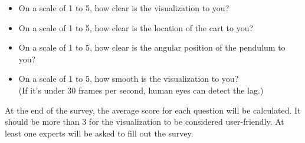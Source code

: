 \documentclass[12pt, titlepage]{article}
\begin{document}
\begin{enumerate}
        \begin{itemize}\renewcommand{\labelitemi}{\scriptsize$\square$}
          \item On a scale of 1 to 5, how clear is the visualization to you?
          \item On a scale of 1 to 5, how clear is the location of the cart to you?
          \item On a scale of 1 to 5, how clear is the angular position of the pendulum to you?
          \item On a scale of 1 to 5, how smooth is the visualization to you? \\
                (If it's under 30 frames per second, human eyes can detect the lag.)
        \end{itemize}
        At the end of the survey, the average score for each question will be calculated.
        It should be more than 3 for the visualization to be considered user-friendly.
        At least one experts will be asked to fill out the survey.








\end{enumerate}

\end{document}
